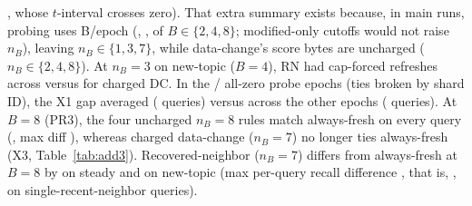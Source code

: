 \RNumAddThreeXThreeDCBTwoNewTopicAbsMean{}, whose $t$-interval crosses zero). That extra summary exists because, in main runs, probing uses \RNumRNOverheadEpochBytes{} B/epoch (\RNumRNOverheadShareBTwo{}, \RNumRNOverheadShareBFour{}, \RNumRNOverheadShareBEight{} of $B \in \{2, 4, 8\}$; modified-only cutoffs would not raise $n_B$), leaving $n_B \in \{1, 3, 7\}$, while data-change's score bytes are uncharged ($n_B \in \{2, 4, 8\}$). At $n_B{=}3$ on new-topic ($B{=}4$), RN had \RNumAddThreeRNForcedSumBFourNewTopic{} cap-forced refreshes across \RNumAddThreeTotalRefreshesBFour{} versus \RNumAddThreeChargedDCForcedSumBFourNewTopic{} for charged DC. In the \RNumSpearmanZeroEpochsNewTopicMThree{}/\RNumEpochsPerCondition{} all-zero probe epochs (ties broken by shard ID), the X1 gap averaged \RNumAddThreeXOneAllZeroGapBFourNewTopic{} (\RNumAddThreeXOneAllZeroQueriesBFourNewTopic{} queries) versus \RNumAddThreeXOneNonZeroGapBFourNewTopic{} across the other \RNumSpearmanPairedNNewTopicMThree{} epochs (\RNumAddThreeXOneNonZeroQueriesBFourNewTopic{} queries). At $B = 8$ (PR3), the four uncharged $n_B = 8$ rules match always-fresh on every query (\RNumPredMThreeBEightFourRulesGap{}, max diff \RNumPredMThreeBEightFourRulesMaxAbs{}), whereas charged data-change ($n_B = 7$) no longer ties always-fresh (X3, Table~\ref{tab:add3}). Recovered-neighbor ($n_B = 7$) differs from always-fresh at $B = 8$ by \RNumPredMThreeBEightRNGapSteady{} on steady and \RNumPredMThreeBEightRNGapNewTopic{} on new-topic (max per-query recall difference \RNumPredMThreeBEightRNMaxAbs{}, that is, \RNumPredMThreeBEightRNMaxAbsPP{}, on single-recent-neighbor queries).

